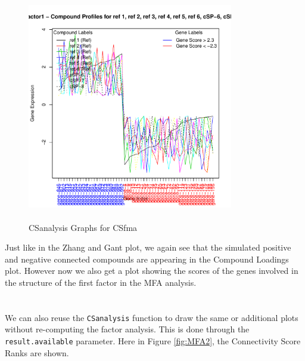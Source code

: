 \documentclass[a4paper]{article}\usepackage[]{graphicx}\usepackage[]{color}
\newenvironment{knitrout}{}{} %
\begin{document}
\begin{knitrout}
\begin{figure}[H]
\includegraphics[width=9cm,height=10cm]{figure/MFA-4} \hfill{}

\caption[CSanalysis Graphs for CSfma]{CSanalysis Graphs for CSfma}\label{fig:MFA}
\end{figure}


\end{knitrout}

\noindent Just like in the Zhang and Gant plot, we again see that the simulated
positive and negative connected compounds are appearing in the Compound Loadings
plot. However now we also get a plot showing the scores of the genes involved in
the structure of the first factor in the MFA analysis.\\
\\ \\
We can also reuse the \texttt{CSanalysis} function to draw the same or
additional plots without re-computing the factor analysis. This is done through the
\texttt{result.available} parameter. Here in Figure \ref{fig:MFA2}, the
Connectivity Score Ranks are shown.
\end{document}
